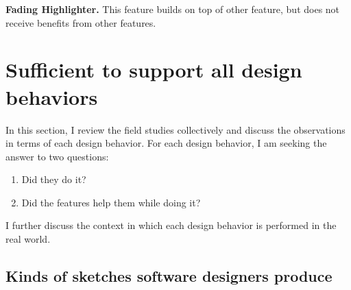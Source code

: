 %
%

\textbf{Fading Highlighter.} This feature builds on top of other feature, but does not receive benefits from other features.

%
%
%

\section{Sufficient to support all design behaviors}
\label{chapter:discussion:design-behaviors}

In this section, I review the field studies collectively and discuss the observations in terms of each design behavior. For each design behavior, I am seeking the answer to two questions:

\begin{enumerate}
	\item Did they do it?
	\item Did the features help them while doing it?
\end{enumerate}

I further discuss the context in which each design behavior is performed in the real world.

\subsection{Kinds of sketches software designers produce}

